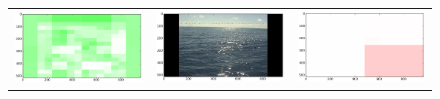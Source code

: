 \begin{figure}[h!tb]
\begin{minipage}{1.3\textwidth}
\begin{tabular}{ccc}
\includegraphics[keepaspectratio=true,width=\segwidth]{images/segment/299_00__animals__.png} &
\includegraphics[keepaspectratio=true,width=\segwidth]{images/segment/299_00__image__.png} &
\includegraphics[keepaspectratio=true,width=\segwidth]{images/segment/299_00__plastic__.png} \\


\end{tabular}
\end{minipage}
\end{figure}
